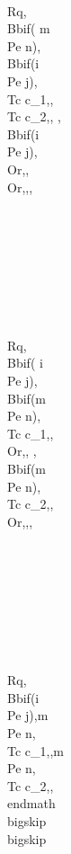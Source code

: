 \\Rq, \\Bb{if( m \\Pe n)}{, \\Bb{if(i \\Pe j)}{,\\Tc c_1,}{,\\Tc c_2,}, }{, \\Bb{if(i \\Pe j)}{, \\Or,}{, \\Or,},}, \\\\\\\\\\\\\\\\
\\Rq, \\Bb{if( i \\Pe j)}{, \\Bb{if(m \\Pe n)}{,\\Tc c_1,}{, \\Or,}, }{, \\Bb{if(m \\Pe n)}{,\\Tc c_2,}{, \\Or,},}, \\\\\\\\\\\\\\\\
\\Rq, \\Bb{if(i \\Pe j)}{,m \\Pe n,\\Tc c_1,}{,m \\Pe n,\\Tc c_2,},
\\end{math}
\\bigskip
\\bigskip



\\[,m \\nPe n, \\Bb{if(i \\Pe j)}{,\\Tc c_1,}{,\\Tc c_2,}, \\Rq , \\Bb{if(i \\Pe j)}{,m \\nPe n,\\Tc c_1,}{,m \\nPe n,\\Tc c_2,},\\]




